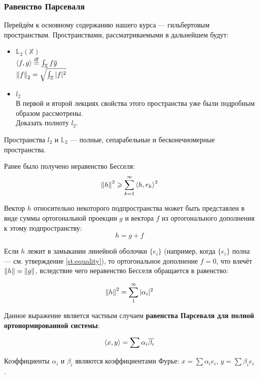 \documentclass[12pt]{article}
\begin{document}
		\subsubsection{Равенство Парсеваля}


			Перейдём к основному содержанию нашего курса --- гильбертовым пространствам. Пространствами,
			рассматриваемыми в дальнейшем будут:

			\begin{itemize}
				\item $\mathbb{L}_2(\mathbb{X})$ \\
				$\left\langle f, g \right\rangle \overset{df}{=} \int_{\mathbb{X}} f\overline{g}$ \\
				$\left\| f \right\|_2 = \sqrt{\int_{\mathbb{X}} |f|^2}$ \\

				\item $l_2$ \\
				В первой и второй лекциях свойства этого пространства уже были подробным образом рассмотрены. \\
				\exc Доказать полноту $l_2$.
			\end{itemize}

			Пространства $l_2$ и $\mathbb{L}_2$ --- полные, сепарабельные и бесконечномерные пространства.

			Ранее было получено неравенство Бесселя:
			$$\left\| h \right\|^2 \geqslant \sum_{k=1}^{\infty}\left\langle h, e_k \right\rangle^2$$
			
			Вектор $h$ относительно некоторого подпространства может быть представлен в виде суммы
			ортогональной проекции $g$ и вектора $f$ из ортогонального дополнения к этому подпространству:
			$$h = g + f$$

			Если $h$ лежит в замыкании линейной оболочки $\{ e_i \}$ (например, когда $\{ e_i \}$ полна --- см. утверждение \ref{st:equality}), то ортогональное дополнение $f = 0$, что влечёт $\left\| h \right\| = \left\| g \right\|$, вследствие чего неравенство Бесселя обращается в равенство:

			$$\left\| h \right\|^2 = \sum_1^{\infty} |\alpha_i|^2$$

			Данное выражение является частным случаем \textbf{равенства Парсеваля для полной ортонормированной системы}:

			$$ \left\langle x, y \right\rangle = \sum \alpha_i \overline{\beta_i} $$

			Коэффициенты $\alpha_i$ и $\beta_i$ являются коэффициентами Фурье: $x = \sum \alpha_i e_i$, $y = \sum \beta_i e_i$.
\end{document}

